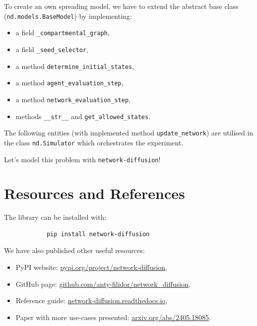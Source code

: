 \documentclass{beamer}
\begin{document}
\begin{frame}{\secname}
    To create an own spreading model, we have to extend the abstract base class
    (\lstinline[style=py]{nd.models.BaseModel}) by implementing:
    \begin{itemize}
        \item a field \lstinline[style=py]{_compartmental_graph},
        \item a field \lstinline[style=py]{_seed_selector},
        \item a method \lstinline[style=py]{determine_initial_states},
        \item a method \lstinline[style=py]{agent_evaluation_step},
        \item a method \lstinline[style=py]{network_evaluation_step},
        \item methods \lstinline[style=py]{__str__} and \lstinline[style=py]{get_allowed_states}.
    \end{itemize}
    \vspace{1em}
    The following entities (with implemented method \lstinline[style=py]{update_network}) are
    utilised in the class \lstinline[style=py]{nd.Simulator} which orchestrates the experiment.
\end{frame}

\begin{frame}{\secname}
    \begin{center}
        \large Let's model this problem with \lstinline[style=py]{network-diffusion}!
    \end{center}
\end{frame}

\section{Resources and References}

\begin{frame}[fragile]{\secname}
    The library can be installed with:
    \begin{center}
        \large
        \begin{verbatim}
            pip install network-diffusion
        \end{verbatim}
    \end{center}
    We have also published other useful resources:
    \begin{itemize}[<+->]
        \item PyPI website: \url{pypi.org/project/network-diffusion},
        \item GitHub page: \url{github.com/anty-filidor/network_diffusion},
        \item Reference guide: \url{network-diffusion.readthedocs.io},
        \item Paper with more use-cases presented: \url{arxiv.org/abs/2405.18085}.
    \end{itemize}
\end{frame}
\end{document}
